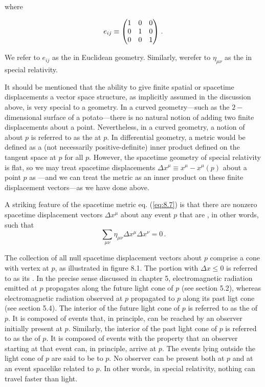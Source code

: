 where 

\begin{equation}\label{eq:8.9}
e_{i j} \equiv \mqty(1 &0 &0\\ 0 &1 &0\\ 0 &0 &1)\;.
\end{equation}

We refer to $e_{ij}$ as the  in Euclidean geometry. Similarly, werefer to $\eta_{\mu \nu}$ as the 
 in special relativity.

It should be mentioned that the ability to give finite spatial or spacetime displacements a vector space structure, as implicitly assumed in the discussion above, is very special to a  geometry. In a curved geometry---such as the $2-$dimensional surface of a potato---there is no natural notion of adding two finite displacements about a point. Nevertheless, in a curved geometry, a notion of 
 about $p$ is referred to as the  at $p$. 
In differential geometry, a metric would be defined as a (not necessarily positive-definite) inner product defined on the tangent space at $p$ for all $p$. However, the spacetime geometry of special relativity is flat, so we may treat  spacetime displacements 
$\Delta x^\mu \equiv x^\mu - x^\mu(p)$ about a point $p$ as ---and we can treat the metric as an inner product on these finite displacement vectors---as we have done above.

A striking feature of the spacetime metric eq. (\ref{eq:8.7}) is that there are nonzero spacetime displacement vectors $\Delta x^\mu$
about any event $p$ that are , in other words, such that 
\begin{equation}\label{eq:8.10}
\sum_{\mu \nu} \eta_{\mu \nu} \Delta x^\mu \Delta x^\nu = 0 \,.
\end{equation}

The collection of all null spacetime displacement vectors about $p$ comprise a cone with vertex at $p$, as illustrated in figure 8.1. The portion with $\Delta x \leq 0$ is referred to as its . In the precise sense discussed in chapter 5, electromagnetic radiation emitted at $p$ propagates along the future light cone of $p$ (see section 5.2), whereas electromagnetic radiation observed at $p$ propagated to $p$ along its past ligt cone (see section 5.4). The interior of the future light cone of $p$ is referred to as the  of $p$. It is composed of events that, in principle, can be reached by an observer initially present at $p$. Similarly, the interior of the past light cone of $p$ is referred to as the  of $p$. It is composed of events with the property that an observer starting at that event can, in principle, arrive at $p$. The events lying outside the light cone of $p$ are said to be  to $p$. No observer can be present both at $p$ and at an event spacelike related to $p$. In other words, in special relativity, nothing can travel faster than light. 

